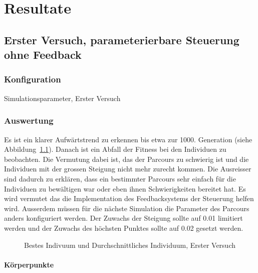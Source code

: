 %
%

\chapter{Resultate\label{chap:Resulate}}

\section{Erster Versuch, parameterierbare Steuerung ohne Feedback}

  \subsection{Konfiguration}

    \begin{table}[H]
      
      \caption{Simulationsparameter, Erster Versuch}
    \end{table}

  \subsection{Auswertung}

    Es ist ein klarer Aufwärtstrend zu erkennen bis etwa zur 1000. Generation (siehe Abbildung~\ref{fig:graphFirst}).
    Danach ist ein Abfall der Fitness bei den Individuen zu beobachten.
    Die Vermutung dabei ist, das der Parcours zu schwierig ist und die Individuen
    mit der grossen Steigung nicht mehr zurecht kommen.
    Die Ausreisser sind dadurch zu erklären,
    dass ein bestimmter Parcours sehr einfach für die Individuen zu bewältigen war oder eben ihnen Schwierigkeiten bereitet hat.
    Es wird vermutet das die Implementation des Feedbacksystems der Steuerung helfen wird.
    Ausserdem müssen für die nächste Simulation die Parameter des Parcours anders konfiguriert werden.
    Der Zuwachs der Steigung sollte auf 0.01 limitiert werden und der Zuwachs des höchsten Punktes
    sollte auf 0.02 gesetzt werden.

      \begin{figure}
        
        \caption{Bestes Indivuum und Durchschnittliches Individuum, Erster Versuch\label{fig:graphFirst}}
      \end{figure}

    \subsubsection{Körperpunkte\label{subsub:bp}}

